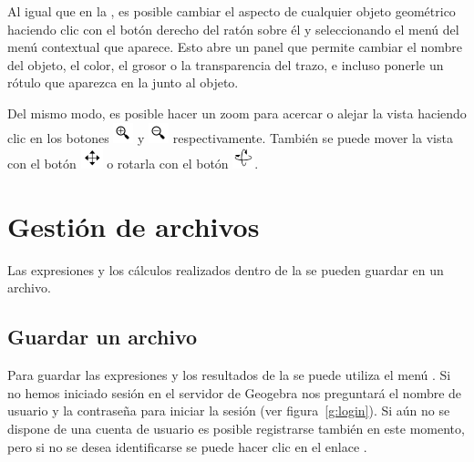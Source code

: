 Al igual que en la , es posible cambiar el aspecto de cualquier objeto geométrico haciendo clic con el botón derecho del ratón sobre él y seleccionando el menú  del menú contextual que aparece.
Esto abre un panel que permite cambiar el nombre del objeto, el color, el grosor o la transparencia del trazo, e incluso ponerle un rótulo que aparezca en la  junto al objeto.

Del mismo modo, es posible hacer un zoom para acercar o alejar la vista haciendo clic en los botones \includegraphics[scale=0.03]{img/introduccion/zoom-in-button} y \includegraphics[scale=0.03]{img/introduccion/zoom-out-button} respectivamente.
También se puede mover la vista con el botón \includegraphics[scale=0.03]{img/introduccion/move-button} o rotarla con el botón \includegraphics[scale=0.03]{img/introduccion/rotate-button}.


\section{Gestión de archivos}
Las expresiones y los cálculos realizados dentro de la  se pueden guardar en un archivo.

\subsection*{Guardar un archivo}
Para guardar las expresiones y los resultados de la  se puede utiliza el menú .
Si no hemos iniciado sesión en el servidor de Geogebra nos preguntará el nombre de usuario y la contraseña para iniciar la sesión (ver figura~\ref{g:login}).
Si aún no se dispone de una cuenta de usuario es posible registrarse también en este momento, pero si no se desea identificarse se puede hacer clic en el enlace .

